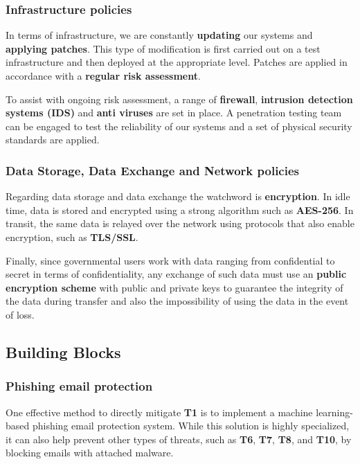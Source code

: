 \documentclass[12pt]{article}
\begin{document}
\subsubsection*{Infrastructure policies}
In terms of infrastructure, we are constantly \textbf{updating} our systems and \textbf{applying patches}. This type of modification is first carried out on a test infrastructure and then deployed at the appropriate level. Patches are applied in accordance with a \textbf{regular risk assessment}.

To assist with ongoing risk assessment, a range of \textbf{firewall}, \textbf{intrusion detection systems (IDS)} and \textbf{anti viruses} are set in place. A penetration testing team can be engaged to test the reliability of our systems and a set of physical security standards are applied.

\subsubsection*{Data Storage, Data Exchange and Network policies}

Regarding data storage and data exchange the watchword is \textbf{encryption}. In idle time, data is stored and encrypted using a strong algorithm such as \textbf{AES-256}.
In transit, the same data is relayed over the network using protocols that also enable encryption, such as \textbf{TLS/SSL}.

Finally, since governmental users work with data ranging from confidential to secret in terms of confidentiality, any exchange of such data must use an \textbf{public encryption scheme} with public and private keys to guarantee the integrity of the data during transfer and also the impossibility of using the data in the event of loss. 

\subsection{Building Blocks}

\subsubsection*{Phishing email protection}
One effective method to directly mitigate \textbf{T1} is to implement a machine learning-based phishing email protection system. While this solution is highly specialized, it can also help prevent other types of threats, such as \textbf{T6}, \textbf{T7}, \textbf{T8}, and \textbf{T10}, by blocking emails with attached malware.
\end{document}
